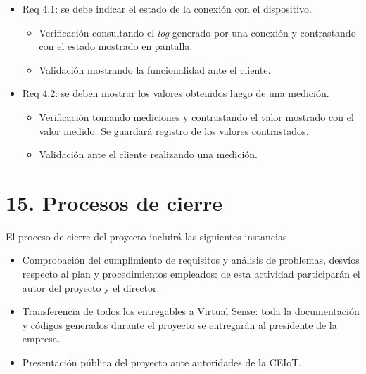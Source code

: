 \documentclass[
11pt, %
]{charter}
\begin{document}
\begin{itemize}
\item Req 4.1: se debe indicar el estado de la conexión con el dispositivo.

\begin{itemize}
	\item Verificación consultando el \textit{log} generado por una conexión y contrastando con el estado mostrado en pantalla.
	\item Validación mostrando la funcionalidad ante el cliente.
\end{itemize}

\end{itemize}

\begin{itemize}
\item Req 4.2: se deben mostrar los valores obtenidos luego de una medición.

\begin{itemize}
	\item Verificación tomando mediciones y contrastando el valor mostrado con el valor medido. Se guardará registro de los valores contrastados.
	\item Validación ante el cliente realizando una medición.
\end{itemize}

\end{itemize}

\section{15. Procesos de cierre}
\label{sec:cierre}

El proceso de cierre del proyecto incluirá las siguientes instancias

\begin{itemize}
	\item Comprobación del cumplimiento de requisitos y análisis de problemas, desvíos respecto al plan y procedimientos empleados: de esta actividad participarán el autor del proyecto y el director.
	
	\item Transferencia de todos los entregables a Virtual Sense: toda la documentación y códigos generados durante el proyecto se entregarán al presidente de la empresa.
	
	\item Presentación pública del proyecto ante autoridades de la CEIoT.
\end{itemize}
\end{document}
